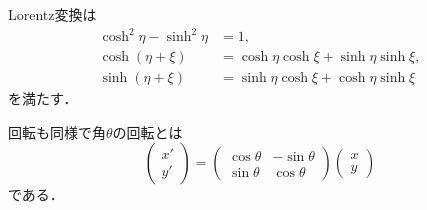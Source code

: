 Lorentz変換は
\begin{align}
		\cosh^2\eta - \sinh^2\eta &= 1,\\
		\cosh(\eta + \xi) &= \cosh\eta \cosh\xi + \sinh\eta\sinh\xi,\\
		\sinh(\eta + \xi) &= \sinh\eta \cosh\xi + \cosh\eta\sinh\xi
\end{align}
を満たす．

回転も同様で角$\theta $の回転とは
\begin{equation}
		\begin{pmatrix}
				x'\\
				y'
		\end{pmatrix}
		= 
		\begin{pmatrix}
				\cos\theta & -\sin\theta\\
				\sin\theta & \cos \theta
		\end{pmatrix}
		\begin{pmatrix}
				x\\
				y
		\end{pmatrix}
\end{equation}
である．

